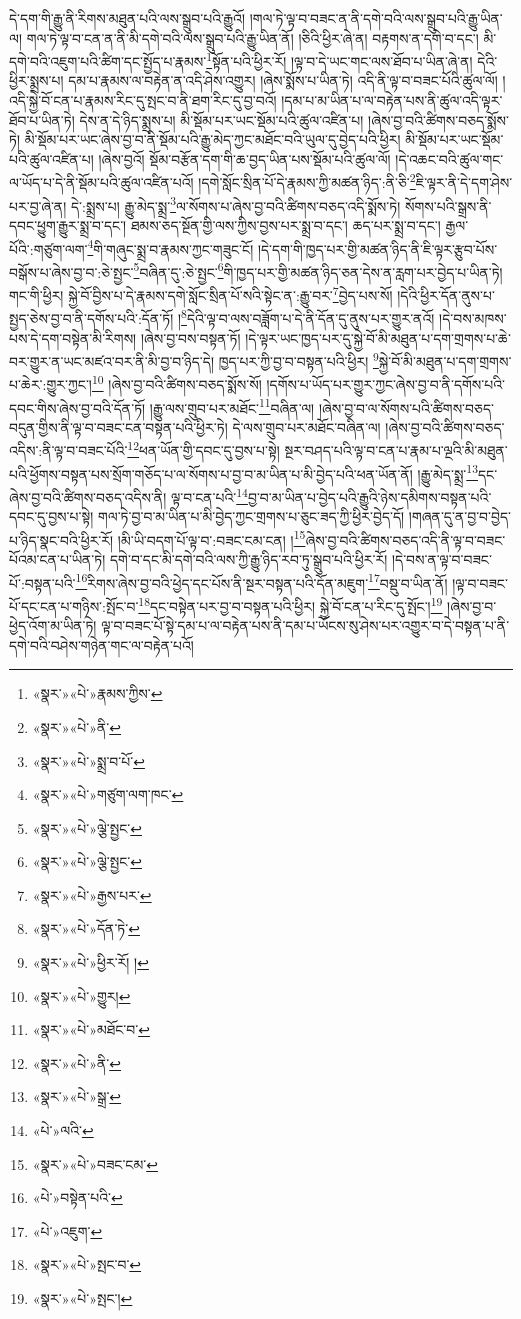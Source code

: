 དེ་དག་གི་རྒྱུ་ནི་རིགས་མཐུན་པའི་ལས་སྒྲུབ་པའི་རྒྱུའོ། །གལ་ཏེ་ལྟ་བ་བཟང་ན་ནི་དགེ་བའི་ལས་སྒྲུབ་པའི་རྒྱུ་ཡིན་ལ། གལ་ཏེ་ལྟ་བ་ངན་ན་ནི་མི་དགེ་བའི་ལས་སྒྲུབ་པའི་རྒྱུ་ཡིན་ནོ། །ཅིའི་ཕྱིར་ཞེ་ན། བརྟགས་ན་དགེ་བ་དང་། མི་དགེ་བའི་འཇུག་པའི་ཚིག་དང་སྤྱོད་པ་རྣམས་\footnote{«སྣར་»«པེ་»རྣམས་ཀྱིས་}སྟོན་པའི་ཕྱིར་རོ། །ལྟ་བ་དེ་ཡང་གང་ལས་ཐོབ་པ་ཡིན་ཞེ་ན། དེའི་ཕྱིར་སྨྲས་པ། དམ་པ་རྣམས་ལ་བརྟེན་ན་འདི་ཤེས་འགྱུར། །ཞེས་སྨོས་པ་ཡིན་ཏེ། འདི་ནི་ལྟ་བ་བཟང་པོའི་ཚུལ་ལོ། །འདི་སྐྱེ་བོ་ངན་པ་རྣམས་རིང་དུ་སྤང་བ་ནི་ཐག་རིང་དུ་བྱ་བའོ། །དམ་པ་མ་ཡིན་པ་ལ་བརྟེན་པས་ནི་ཚུལ་འདི་ལྟར་ཐོབ་པ་ཡིན་ཏེ། དེས་ན་དེ་ཉིད་སྨྲས་པ། མི་སྡོམ་པར་ཡང་སྡོམ་པའི་ཚུལ་འཛིན་པ། །ཞེས་བྱ་བའི་ཚིགས་བཅད་སྨོས་ཏེ། མི་སྡོམ་པར་ཡང་ཞེས་བྱ་བ་ནི་སྡོམ་པའི་རྒྱུ་མེད་ཀྱང་མཐོང་བའི་ཡུལ་དུ་བྱེད་པའི་ཕྱིར། མི་སྡོམ་པར་ཡང་སྡོམ་པའི་ཚུལ་འཛིན་པ། །ཞེས་བྱའོ། སྡོམ་བརྩོན་དག་གི་ཆ་བྱད་ཡིན་པས་སྡོམ་པའི་ཚུལ་ལོ། །དེ་འཆང་བའི་ཚུལ་གང་ལ་ཡོད་པ་དེ་ནི་སྡོམ་པའི་ཚུལ་འཛིན་པའོ། །དགེ་སློང་སྲིན་པོ་དེ་རྣམས་ཀྱི་མཚན་ཉིད་:ནི་ཅི་\footnote{«སྣར་»«པེ་»ནི་}ཇི་ལྟར་ནི་དེ་དག་ཤེས་པར་བྱ་ཞེ་ན། དེ་:སྨྲས་པ། རྒྱུ་མེད་སྨྲ་\footnote{«སྣར་»«པེ་»སྨྲ་བ་པོ་}ལ་སོགས་པ་ཞེས་བྱ་བའི་ཚིགས་བཅད་འདི་སྨོས་ཏེ། སོགས་པའི་སྒྲས་ནི་དབང་ཕྱུག་རྒྱུར་སྨྲ་བ་དང་། ཐམས་ཅད་སྔོན་གྱི་ལས་ཀྱིས་བྱས་པར་སྨྲ་བ་དང་། ཆད་པར་སྨྲ་བ་དང་། རྒྱལ་པོའི་:གཙུག་ལག་\footnote{«སྣར་»«པེ་»གཙུག་ལག་ཁང་}གི་གཞུང་སྨྲ་བ་རྣམས་ཀྱང་གཟུང་ངོ། །དེ་དག་གི་ཁྱད་པར་གྱི་མཚན་ཉིད་ནི་ཇི་ལྟར་རྩུབ་པོས་བསྒོས་པ་ཞེས་བྱ་བ་:ཅེ་སྤྱང་\footnote{«སྣར་»«པེ་»ལྕེ་སྤྱང་}བཞིན་དུ་:ཅེ་སྤྱང་\footnote{«སྣར་»«པེ་»ལྕེ་སྤྱང་}གི་ཁྱད་པར་གྱི་མཚན་ཉིད་ཅན་དེས་ན་རླག་པར་བྱེད་པ་ཡིན་ཏེ། གང་གི་ཕྱིར། སྐྱེ་བོ་བྱིས་པ་དེ་རྣམས་དགེ་སློང་སྲིན་པོ་སའི་སྟེང་ན་:རྒྱུ་བར་\footnote{«སྣར་»«པེ་»རྒྱས་པར་}བྱེད་པས་སོ། །དེའི་ཕྱིར་དོན་ནུས་པ་སྤྱད་ཅེས་བྱ་བ་ནི་དགོས་པའི་:དོན་ཏོ། །\footnote{«སྣར་»«པེ་»དོན་ཏེ་}དེའི་ལྟ་བ་ལས་བཟློག་པ་དེ་ནི་དོན་དུ་ནུས་པར་གྱུར་ནའོ། །དེ་བས་མཁས་པས་དེ་དག་བསྟེན་མི་རིགས། །ཞེས་བྱ་བས་བསྟན་ཏོ། །དེ་ལྟར་ཡང་ཁྱད་པར་དུ་སྐྱེ་བོ་མི་མཐུན་པ་དག་གྲགས་པ་ཆེ་བར་གྱུར་ན་ཡང་མཛའ་བར་ནི་མི་བྱ་བ་ཉིད་དེ། ཁྱད་པར་ཀྱི་བྱ་བ་བསྟན་པའི་ཕྱིར། \footnote{«སྣར་»«པེ་»ཕྱིར་རོ། ། }སྐྱེ་བོ་མི་མཐུན་པ་དག་གྲགས་པ་ཆེར་:གྱུར་ཀྱང་།\footnote{«སྣར་»«པེ་»གྱུར།} །ཞེས་བྱ་བའི་ཚིགས་བཅད་སྨོས་སོ། །དགོས་པ་ཡོད་པར་གྱུར་ཀྱང་ཞེས་བྱ་བ་ནི་དགོས་པའི་དབང་གིས་ཞེས་བྱ་བའི་དོན་ཏོ། །རྒྱུ་ལས་གྲུབ་པར་མཐོང་\footnote{«སྣར་»«པེ་»མཐོང་བ་}བཞིན་ལ། །ཞེས་བྱ་བ་ལ་སོགས་པའི་ཚིགས་བཅད་བདུན་གྱིས་ནི་ལྟ་བ་བཟང་ངན་བསྟན་པའི་ཕྱིར་ཏེ། དེ་ལས་གྲུབ་པར་མཐོང་བཞིན་ལ། །ཞེས་བྱ་བའི་ཚིགས་བཅད་འདིས་:ནི་ལྟ་བ་བཟང་པོའི་\footnote{«སྣར་»«པེ་»ནི་}ཕན་ཡོན་གྱི་དབང་དུ་བྱས་པ་སྟེ། སྔར་བཤད་པའི་ལྟ་བ་ངན་པ་རྣམ་པ་ལྔའི་མི་མཐུན་པའི་ཕྱོགས་བསྟན་པས་སྲོག་གཅོད་པ་ལ་སོགས་པ་བྱ་བ་མ་ཡིན་པ་མི་བྱེད་པའི་ཕན་ཡོན་ནོ། །རྒྱུ་མེད་སྨྲ་\footnote{«སྣར་»«པེ་»སྒྲ་}དང་ཞེས་བྱ་བའི་ཚིགས་བཅད་འདིས་ནི། ལྟ་བ་ངན་པའི་\footnote{«པེ་»ལའི་}བྱ་བ་མ་ཡིན་པ་བྱེད་པའི་རྒྱུའི་ཉེས་དམིགས་བསྟན་པའི་དབང་དུ་བྱས་པ་སྟེ། གལ་ཏེ་བྱ་བ་མ་ཡིན་པ་མི་བྱེད་ཀྱང་གྲགས་པ་ཅུང་ཟད་ཀྱི་ཕྱིར་བྱེད་དོ། །གཞན་དུ་ན་བྱ་བ་བྱེད་པ་ཉིད་སྣང་བའི་ཕྱིར་རོ། །མི་ཡི་བདག་པོ་ལྟ་བ་:བཟང་ངམ་ངན། །\footnote{«སྣར་»«པེ་»བཟང་ངམ་}ཞེས་བྱ་བའི་ཚིགས་བཅད་འདི་ནི་ལྟ་བ་བཟང་པོའམ་ངན་པ་ཡིན་ཏེ། དགེ་བ་དང་མི་དགེ་བའི་ལས་ཀྱི་རྒྱུ་ཉིད་རབ་ཏུ་སྒྲུབ་པའི་ཕྱིར་རོ། །དེ་བས་ན་ལྟ་བ་བཟང་པོ་:བསྟན་པའི་\footnote{«པེ་»བསྟེན་པའི་}རིགས་ཞེས་བྱ་བའི་ཕྱེད་དང་པོས་ནི་སྔར་བསྟན་པའི་དོན་མཇུག་\footnote{«པེ་»འཇུག་}བསྡུ་བ་ཡིན་ནོ། །ལྟ་བ་བཟང་པོ་དང་ངན་པ་གཉིས་:སྤོང་བ་\footnote{«སྣར་»«པེ་»སྤང་བ་}དང་བསྟེན་པར་བྱ་བ་བསྟན་པའི་ཕྱིར། སྐྱེ་བོ་ངན་པ་རིང་དུ་སྤོང་།\footnote{«སྣར་»«པེ་»སྤང་།} །ཞེས་བྱ་བ་ཕྱེད་འོག་མ་ཡིན་ཏེ། ལྟ་བ་བཟང་པོ་སྟེ་དམ་པ་ལ་བརྟེན་པས་ནི་དམ་པ་ཡོངས་སུ་ཤེས་པར་འགྱུར་བ་དེ་བསྟན་པ་ནི་དགེ་བའི་བཤེས་གཉེན་གང་ལ་བརྟེན་པའོ། 